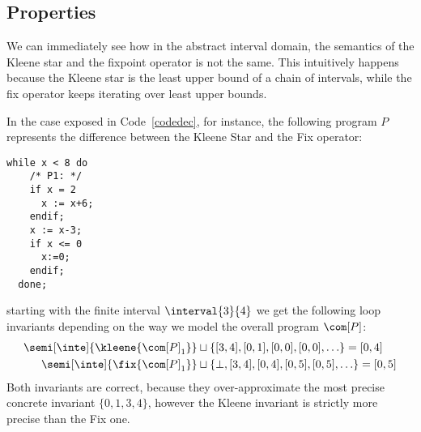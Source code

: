 \subsection{Properties}\label{sub:intervalsprop}

We can immediately see how in the abstract interval domain, the
semantics of the Kleene star and the fixpoint operator is not the
same. This intuitively happens because the Kleene star is the least
upper bound of a chain of intervals, while the fix operator keeps
iterating over least upper bounds.

\begin{example}\label{ex:fix} In the case exposed in
  Code~\ref{codedec}, for instance, the following program \(P\)
  represents the difference between the Kleene Star and the Fix
  operator:
  \begin{lstlisting}[caption=Program P\, denoting \(\fix{\com}\) and \(\com^*\) difference, label=codedec, language=Imp]
  while x < 8 do
    /* P1: */
    if x = 2
      x := x+6;
    endif;
    x := x-3;
    if x <= 0
      x:=0;
    endif;
  done;
  \end{lstlisting}
  starting with the finite interval \(\interval{3}{4}\) we get the
  following loop invariants depending on the way we model the overall
  program \(\com[P]\):
  \begin{align*}
    \semi[\inte]{\kleene{\com[P]_1}} &\sqcup\{[3,4], [0,1], [0,0], [0,0], \ldots\} = [0,4]\\
    \semi[\inte]{\fix{\com[P]_1}} & \sqcup\{\bot, [3,4], [0,4], [0,5], [0,5],\ldots\} = [0,5]
  \end{align*}
  \noindent
  Both invariants are correct, because they over-approximate the most
  precise concrete invariant \(\{0,1,3,4\}\), however the Kleene
  invariant is strictly more precise than the Fix one.
\end{example}


